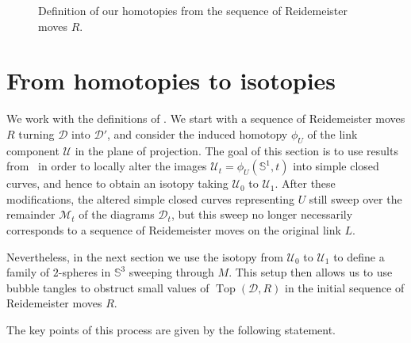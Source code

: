 \documentclass{article}
\newcommand{\R}{\mathbb{R}}
\newcommand{\Sp}{\mathbb{S}}
\newcommand\tikzmark[5][0]{\tikz[overlay,remember picture,baseline] \node [rotate=#1,anchor=base,xshift=#4,yshift=#5] (#2) {$\scriptstyle#3$};}
\newcommand{\addcross}{\operatorname{Top}}
\begin{document}
\begin{figure}[ht]
\begin{center}
\caption{Definition of our homotopies from the sequence of Reidemeister moves $R$.}
\label{pic_commut_op_def}
\end{center}
\end{figure}

\section{From homotopies to isotopies}\label{sec_homo_iso}

We work with the definitions of . We start with a sequence of Reidemeister moves $R$ turning $\mathcal{D}$ into $\mathcal{D}'$, and consider the induced homotopy $\phi_U$ of the link component $\mathcal{U}$ in the plane of projection. The goal of this section is to use results from~\cite{Chambers_homo-isotopy} in order to locally alter the images $\mathcal{U}_t=\phi_U(\Sp^1,t)$ into simple closed curves, and hence to obtain an isotopy taking $\mathcal{U}_0$ to $\mathcal{U}_1$. 
After these modifications, the altered simple closed curves representing $U$ still sweep over the remainder $\mathcal{M}_t$ of the diagrams $\mathcal{D}_t$, but this sweep no longer necessarily corresponds to a sequence of Reidemeister moves on the original link $L$.

Nevertheless, in the next section we use the isotopy from $\mathcal{U}_0$ to $\mathcal{U}_1$ to define a family of $2$-spheres in $\Sp^3$ sweeping through $M$. This setup then allows us to use bubble tangles to obstruct small values of $\addcross(\mathcal{D},R)$ in the initial sequence of Reidemeister moves $R$.

\medskip

The key points of this process are given by the following statement.
\end{document}
